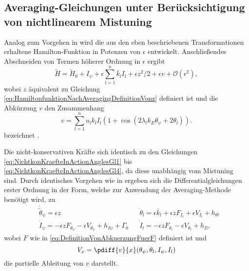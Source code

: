 \subsection[Averaging-Gleichungen mit nichtlinearem Mistuning]{Averaging-Gleichungen unter Berücksichtigung von nichtlinearem Mistuning} \label{subsec:AveragingGlMitMistuning}
%
%
%
%
%
Analog zum Vorgehen in  wird die aus den eben beschriebenen Transformationen erhaltene Hamilton-Funktion in Potenzen von $\epsilon$ entwickelt. Anschließendes Abschneiden von Termen höherer Ordnung in $\epsilon$ ergibt  
\begin{equation}
		\tilde{H} = \tilde{H}_0 + I_{\psi} + \epsilon \sum_{l=1}^n \bar{k}_l I_l + \epsilon {z^2}/{2} + \epsilon v  + \mathcal{O}(\epsilon^2),
	\label{eq:HamiltonfunktionNachAveragingMitMistuningUndzUndv}
\end{equation}
wobei $z$ äquivalent zu Gleichung  \eqref{eq:HamiltonfunktionNachAveragingDefinitionVonz} %
%
%
definiert ist und die Abkürzung $v$ den Zusammenhang
%
%
\begin{equation}
		v =  \sum_{l=1}^n u_l k_l I_l \left( 1 + \cos(2 \lambda_l k_E \theta_{\psi} + 2 \theta_l) \right)  .
	\label{eq:HamiltonfunktionNachAveragingMitMistuningDefVonv}
\end{equation}
bezeichnet \cite{Mayet:CPVAMitMistuning}.






Die nicht-konservativen Kräfte sich identisch zu den
Gleichungen \eqref{eq:NichtkonKraefteInActionAnglesGl1} bis \eqref{eq:NichtkonKraefteInActionAnglesGl4}, da diese unabhängig vom Mistuning sind.
Durch identisches Vorgehen wie in  ergeben sich die Differentialgleichungen erster Ordnung in der Form,
welche zur Anwendung der Averaging-Methode benötigt wird, zu 
%
%
% 
\begin{align}
		& \dot{\tilde{\theta}}_{\psi} = \epsilon z  &  
		& \dot{\theta}_{l} = \epsilon \bar{k}_l + \epsilon z F_{I_l} + \epsilon V_{I_l}  + h_{\theta l} \\
		& \dot{I}_{\psi} = - \epsilon z F_{\theta_\psi} - \epsilon V_{\theta_\psi} + h_{I \psi} + \Gamma_0 &
		& \dot{I}_{l} = - \epsilon z F_{\theta_l} - \epsilon V_{\theta_l} + h_{Il},
	\label{eq:GleichungenVorAveragingMitMistuningTeil2}
\end{align}
wobei $F$ wie in 	\eqref{eq:DefinitionVonAbkuerzungFuerF} definiert ist und
\begin{equation}
	V_x	 = \pdiff{v}{x}(\theta_{\psi},\theta_l,I_{\psi},I_l)			
	\label{eq:DefinitionVonAbkuerzungFuerV}
\end{equation}
die partielle Ableitung von $v$  darstellt.


